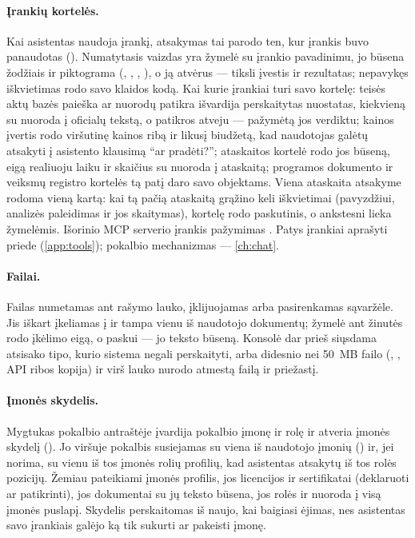 \paragraph{Įrankių kortelės.} Kai asistentas naudoja įrankį, atsakymas tai parodo ten, kur
įrankis buvo panaudotas (). Numatytasis vaizdas yra žymelė su
įrankio pavadinimu, jo būsena žodžiais ir piktograma (, , ,
), o ją atvėrus --- tiksli įvestis ir rezultatas; nepavykęs iškvietimas rodo savo
klaidos kodą. Kai kurie įrankiai turi savo kortelę: teisės aktų bazės paieška ar nuorodų patikra
išvardija perskaitytas nuostatas, kiekvieną su nuoroda į oficialų tekstą, o patikros atveju ---
pažymėtą jos verdiktu; kainos įvertis rodo viršutinę kainos ribą ir likusį biudžetą, kad
naudotojas galėtų atsakyti į asistento klausimą \enquote{ar pradėti?}; ataskaitos kortelė rodo
jos būseną, eigą realiuoju laiku ir skaičius su nuoroda į ataskaitą; programos dokumento ir
veiksmų registro kortelės tą patį daro savo objektams. Viena ataskaita atsakyme rodoma vieną
kartą: kai tą pačią ataskaitą grąžino keli iškvietimai (pavyzdžiui, analizės paleidimas ir jos
skaitymas), kortelę rodo paskutinis, o ankstesni lieka žymelėmis. Išorinio MCP serverio įrankis pažymimas
. Patys įrankiai aprašyti priede (\cref{app:tools}); pokalbio mechanizmas ---
\cref{ch:chat}.

\paragraph{Failai.} Failas numetamas ant rašymo lauko, įklijuojamas arba pasirenkamas sąvaržėle.
Jis iškart įkeliamas į  ir tampa vienu iš naudotojo dokumentų;
žymelė ant žinutės rodo įkėlimo eigą, o paskui --- jo teksto būseną. Konsolė dar prieš
siųsdama atsisako tipo, kurio sistema negali perskaityti, arba didesnio nei 50~MB failo
(, , API ribos kopija) ir virš lauko
nurodo atmestą failą ir priežastį.

\paragraph{Įmonės skydelis.} Mygtukas pokalbio antraštėje įvardija pokalbio įmonę ir rolę ir
atveria įmonės skydelį (). Jo viršuje pokalbis susiejamas su
viena iš naudotojo įmonių () ir, jei norima, su vienu iš tos įmonės rolių
profilių, kad asistentas atsakytų iš tos rolės pozicijų. Žemiau pateikiami įmonės profilis, jos
licencijos ir sertifikatai (deklaruoti ar patikrinti), jos dokumentai su jų teksto būsena, jos
rolės ir nuoroda į visą įmonės puslapį. Skydelis perskaitomas iš naujo, kai baigiasi ėjimas,
nes asistentas savo įrankiais galėjo ką tik sukurti ar pakeisti įmonę.

